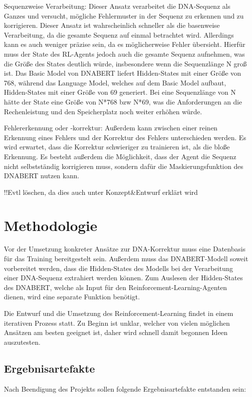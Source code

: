 \documentclass[oneside,bibliography=totocnumbered,BCOR=5mm]{scrbook}%
\theoremstyle{definition}
\theoremstyle{definition}
\theoremstyle{definition}
\theoremstyle{definition}
\theoremstyle{definition}
\theoremstyle{definition}
\begin{document}
Sequenzweise Verarbeitung: Dieser Ansatz verarbeitet die DNA-Sequenz als Ganzes und versucht, 
mögliche Fehlermuster in der Sequenz zu erkennen und zu korrigieren. 
Dieser Ansatz ist wahrscheinlich schneller als die basenweise Verarbeitung, 
da die gesamte Sequenz auf einmal betrachtet wird. 
Allerdings kann es auch weniger präzise sein, da es möglicherweise Fehler übersieht.
Hierfür muss der State des RL-Agents jedoch auch die gesamte Sequenz aufnehmen, 
was die Größe des States deutlich würde, insbesondere wenn die Sequenzlänge N groß ist. 
Das Basic Model von DNABERT liefert Hidden-States mit einer Größe von 768, 
während das Language Model, welches auf dem Basic Model aufbaut, Hidden-States mit einer Größe von 69 generiert. 
Bei eine Sequenzlänge von N hätte der State eine Größe von N*768 bzw N*69, 
was die Anforderungen an die Rechenleistung und den Speicherplatz noch weiter erhöhen würde.


Fehlererkennung oder -korrektur: Außerdem kann zwischen einer reinen Erkennung eines Fehlers und
der Korrektur des Fehlers unterschieden werden. Es wird erwartet, dass die Korrektur 
schwieriger zu trainieren ist, als die bloße Erkennung. Es besteht außerdem die Möglichkeit,
dass der Agent die Sequenz nicht selbstständig korrigieren muss, sondern dafür die Maskierungsfunktion
des DNABERT nutzen kann.


!!Evtl löschen, da dies auch unter Konzept\&Entwurf erklärt wird

\clearpage

\chapter{Methodologie}

Vor der Umsetzung konkreter Ansätze zur DNA-Korrektur muss eine Datenbasis 
für das Training bereitgestelt sein. Außerdem muss das DNABERT-Modell soweit vorbereitet werden,
dass die Hidden-States des Modells bei der Verarbeitung einer DNA-Sequenz extrahiert werden können.
Zum Auslesen der Hidden-States des DNABERT, welche als Input für den Reinforcement-Learning-Agenten dienen,
wird eine separate Funktion benötigt.


Die Entwurf und die Umsetzung des Reinforcement-Learning findet in einem iterativen Prozess statt.
Zu Beginn ist unklar, welcher von vielen möglichen Ansätzen am besten geeignet ist, daher wird schnell
damit begonnen Ideen auszutesten.

\section{Ergebnisartefakte}
Nach Beendigung des Projekts sollen folgende Ergebnisartefakte entstanden sein:
\end{document}

